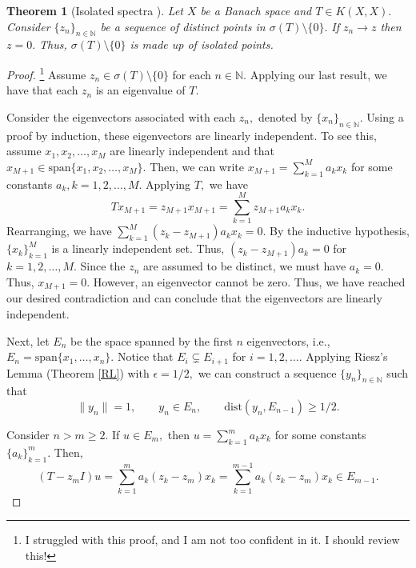 \documentclass[12pt,a4paper]{article}
\theoremstyle{boldthm}
\newtheorem{theorem}{Theorem}[section]
\theoremstyle{bolddefn}
\begin{document}
\begin{theorem}[Isolated spectra \cite{umberto}] \label{isolated}
    Let $X$ be a Banach space and $T \in K(X, X).$ Consider $\{z_n\}_{n \in \mathbb{N}}$ be a sequence of distinct points in $\sigma(T) \setminus \{0\}.$ If $z_n \rightarrow z$ then $z=0.$ Thus, $\sigma(T) \setminus \{0\}$ is made up of isolated points.
\end{theorem}
\begin{proof}\footnote{I struggled with this proof, and I am not too confident in it. I should review this!}
    Assume $z_n \in \sigma(T) \setminus \{0\}$ for each $n \in \mathbb{N}.$ Applying our last result, we have that each $z_n$ is an eigenvalue of $T.$ 
    
    Consider the eigenvectors associated with each $z_n,$  denoted by $\{x_n\}_{n \in \mathbb{N}}.$ Using a proof by induction, these eigenvectors are linearly independent. To see this, assume $x_1, x_2, \dots, x_{M}$ are linearly independent and that $x_{M+1} \in \text{span}\{x_1, x_2, \dots, x_M\}$. Then, we can write $x_{M+1} = \sum_{k=1}^{M} a_k x_k$ for some constants $a_k, k=1, 2, \dots, M.$ Applying $T,$ we have 
    \begin{equation}
        T x_{M+1} = z_{M+1} x_{M+1} = \sum_{k=1}^{M} z_{M+1} a_k x_k.
    \end{equation}
    Rearranging, we have $\sum_{k=1}^ {M} (z_k - z_{M+1}) a_k x_k = 0.$ By the inductive hypothesis, $\{x_k\}_{k=1}^{M}$ is a linearly independent set. Thus, $(z_k - z_{M+1})a_k = 0$ for $k=1, 2, \dots, M.$ Since the $z_n$ are assumed to be distinct, we must have $a_k = 0.$ Thus, $x_{M+1}=0.$ However, an eigenvector cannot be zero. Thus, we have reached our desired contradiction and can conclude that the eigenvectors are linearly independent. 

    Next, let $E_n$ be the space spanned by the first $n$ eigenvectors, i.e., $E_n = \text{span}\{x_1, \dots, x_n\}.$ Notice that $E_i \subsetneq E_{i+1}$ for $i = 1, 2, \dots.$ Applying Riesz's Lemma (Theorem \ref{RL}) with $\epsilon = 1/2,$ we can construct a sequence $\{y_n\}_{n \in \mathbb{N}}$ such that
    \begin{equation} \label{lem}
        \|y_n \| = 1, \qquad y_n \in E_n,  \qquad \text{dist}(y_n, E_{n-1}) \ge 1/2.
    \end{equation}

    Consider $n > m \ge 2.$
    If $u \in E_m,$ then $ u = \sum_{k=1}^{m} a_k x_k$ for some constants $\{a_k\}_{k=1}^{m}.$ Then,
    \begin{equation} \label{need}
        (T - z_m I) u = \sum_{k=1}^{m} a_k (z_k - z_m) x_k = \sum_{k=1}^{m-1} a_k (z_k - z_m) x_k \in E_{m-1}. 
    \end{equation}


\end{proof}
\end{document}
